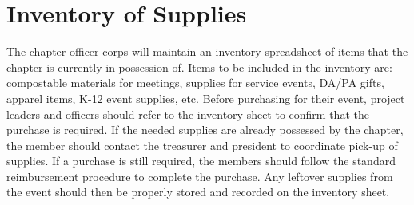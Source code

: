 \documentclass[bylaws,final,10pt,withoutoptional,withoutpreface,officerdoc]{../bylaws}
\begin{document}
\section{Inventory of Supplies} The chapter officer corps will maintain an inventory spreadsheet of items that the chapter is currently in possession of. Items to be included in the inventory are: compostable materials for meetings, supplies for service events, DA/PA gifts, apparel items, K-12 event supplies, etc. Before purchasing for their event, project leaders and officers should refer to the inventory sheet to confirm that the purchase is required. If the needed supplies are already possessed by the chapter, the member should contact the treasurer and president to coordinate pick-up of supplies. If a purchase is still required, the members should follow the standard reimbursement procedure to complete the purchase. Any leftover supplies from the event should then be properly stored and recorded on the inventory sheet.
\end{document}
